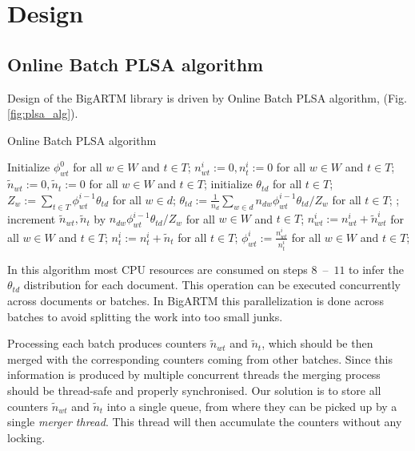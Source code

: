 \documentclass[11pt,a4paper,twoside]{report}
\begin{document}
\section{Design}

\subsection{Online Batch PLSA algorithm}

Design of the BigARTM library is driven by Online Batch PLSA algorithm,
(Fig. \ref{fig:plsa_alg}).

\begin{algorithm}
\caption{Online Batch PLSA algorithm}
\label{fig:plsa_alg}
\begin{algorithmic}[1]
\STATE Initialize $\phi^0_{wt}$ for all $w \in W$ and $t \in T$;
    \STATE $n^i_{wt} := 0, n^i_t := 0$ for all $w \in W$ and $t \in T$;
		\STATE $\tilde n_{wt} := 0, \tilde n_t := 0$ for all $w \in W$ and $t \in T$;
			\STATE initialize $\theta_{td}$ for all $t \in T$;
			\REPEAT
				\STATE $Z_w := \sum_{t \in T} \phi^{i-1}_{wt} \theta_{td}$ for all $w \in d$;
				\STATE $\theta_{td} := \frac{1}{n_d} \sum_{w \in d} n_{dw} \phi^{i-1}_{wt} \theta_{td} / Z_w$
                       for all $t \in T$;
			;
			\STATE increment $\tilde n_{wt}, \tilde n_t$ by $n_{dw} \phi^{i-1}_{wt} \theta_{td} / Z_w$
                   for all $w \in W$ and $t \in T$;
		\ENDFOR
        \STATE $n^i_{wt} := n^i_{wt} + \tilde n^i_{wt}$ for all $w \in W$ and $t \in T$;
        \STATE $n^i_t := n^i_t + \tilde n_t$ for all $t \in T$;
    \ENDFOR
	\STATE $\phi^{i}_{wt} := \frac{n^i_{wt}}{n^i_{t}}$
           for all $w \in W$ and $t \in T$;
\ENDFOR
\end{algorithmic}
\end{algorithm}

In this algorithm most CPU resources are consumed on steps $8$~--~$11$
to infer the $\theta_{td}$ distribution for each document.
This operation can be executed concurrently across documents or batches.
In BigARTM this parallelization is done across batches to avoid splitting the work into too small junks.

Processing each batch produces counters $\tilde n_{wt}$ and $\tilde n_{t}$,
which should be then merged with the corresponding counters coming from other batches.
Since this information is produced by multiple concurrent threads
the merging process should be thread-safe and properly synchronised.
Our solution is to store all counters $\tilde n_{wt}$ and $\tilde n_{t}$ into a single queue,
from where they can be picked up by a single \emph{merger thread}.
This thread will then accumulate the counters without any locking.
\end{document}
